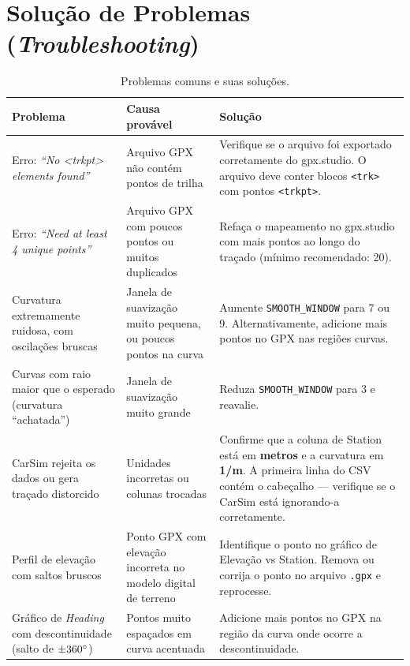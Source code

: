 \documentclass[a4paper,12pt]{article}
\begin{document}
\section{Solução de Problemas (\textit{Troubleshooting})}

\begin{table}[H]
\centering
\caption{Problemas comuns e suas soluções.}
\label{tab:troubleshooting}
\renewcommand{\arraystretch}{1.4}
\begin{tabularx}{\textwidth}{>{\raggedright\arraybackslash}p{4.5cm} >{\raggedright\arraybackslash}p{3.5cm} X}
\toprule
\textbf{Problema} & \textbf{Causa provável} & \textbf{Solução} \\
\midrule
Erro: \textit{``No <trkpt> elements found''} & Arquivo GPX não contém pontos de trilha & Verifique se o arquivo foi exportado corretamente do gpx.studio. O arquivo deve conter blocos \texttt{<trk>} com pontos \texttt{<trkpt>}. \\
\midrule
Erro: \textit{``Need at least 4 unique points''} & Arquivo GPX com poucos pontos ou muitos duplicados & Refaça o mapeamento no gpx.studio com mais pontos ao longo do traçado (mínimo recomendado: 20). \\
\midrule
Curvatura extremamente ruidosa, com oscilações bruscas & Janela de suavização muito pequena, ou poucos pontos na curva & Aumente \texttt{SMOOTH\_WINDOW} para 7 ou 9. Alternativamente, adicione mais pontos no GPX nas regiões curvas. \\
\midrule
Curvas com raio maior que o esperado (curvatura ``achatada'') & Janela de suavização muito grande & Reduza \texttt{SMOOTH\_WINDOW} para 3 e reavalie. \\
\midrule
CarSim rejeita os dados ou gera traçado distorcido & Unidades incorretas ou colunas trocadas & Confirme que a coluna de Station está em \textbf{metros} e a curvatura em \textbf{1/m}. A primeira linha do CSV contém o cabeçalho --- verifique se o CarSim está ignorando-a corretamente. \\
\midrule
Perfil de elevação com saltos bruscos & Ponto GPX com elevação incorreta no modelo digital de terreno & Identifique o ponto no gráfico de Elevação vs Station. Remova ou corrija o ponto no arquivo \texttt{.gpx} e reprocesse. \\
\midrule
Gráfico de \textit{Heading} com descontinuidade (salto de $\pm 360\degree$) & Pontos muito espaçados em curva acentuada & Adicione mais pontos no GPX na região da curva onde ocorre a descontinuidade. \\
\bottomrule
\end{tabularx}
\end{table}
\end{document}
